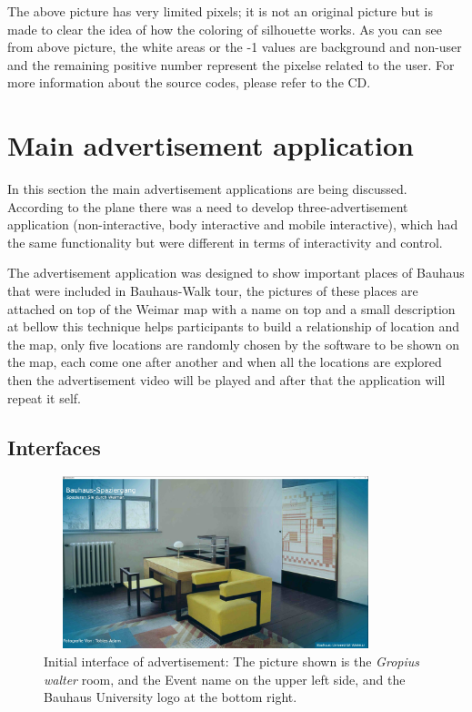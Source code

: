 The above picture has very limited pixels; it is not an original picture but is made to clear the idea of how the coloring of silhouette  works.
As you can see from above picture, the white areas or the -1 values are background and non-user and the remaining positive number represent the pixelse related to the user.
For more information about the source codes, please refer to the CD.


\section{Main advertisement application}
In this section the main advertisement applications are being discussed.
According to the plane there was a need to develop three-advertisement application (non-interactive, body interactive and mobile interactive), which had the same functionality but were different in terms of interactivity and control.

The advertisement application was designed to show important places of Bauhaus that were included in Bauhaus-Walk tour, the pictures of these places are attached on top of the Weimar map with a name on top and a small description at bellow this technique helps participants to build a relationship of location and the map, only five locations are randomly chosen by the software to be shown on the map, each come one after another and when all the locations are explored then the advertisement video will be played and after that the application will repeat it self.

\newpage
\subsection{Interfaces}

\begin{figure}[H]
    \centering
    \includegraphics[width=100mm,height=50mm]{Figures/7/initialpage}
    \caption{Initial interface of advertisement: The picture shown is the \emph{Gropius walter} room, and the Event name on the upper left side, and the Bauhaus University logo at the bottom right.}%
    \label{fig:adInitialpage}%
\end{figure}



